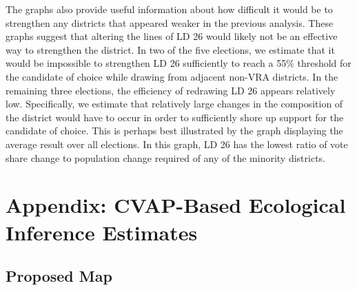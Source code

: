 \documentclass[12pt]{article}
\begin{document}
The graphs also provide useful information about how difficult it would be to strengthen any districts that appeared weaker in the previous analysis. These graphs suggest that altering the lines of LD 26 would likely not be an effective way to strengthen the district. In two of the five elections, we estimate that it would be impossible to strengthen LD 26 sufficiently to reach a 55\% threshold for the candidate of choice while drawing from adjacent non-VRA districts. In the remaining three elections, the efficiency of redrawing LD 26 appears relatively low. Specifically, we estimate that relatively large changes in the composition of the district would have to occur in order to sufficiently shore up support for the candidate of choice. This is perhaps best illustrated by the graph displaying the average result over all elections. In this graph, LD 26 has the lowest ratio of vote share change to population change required of any of the minority districts.

\clearpage
\appendix

\section{Appendix: CVAP-Based Ecological Inference Estimates}
\subsection{Proposed Map}












\clearpage











\clearpage











\clearpage











\clearpage











\end{document}
